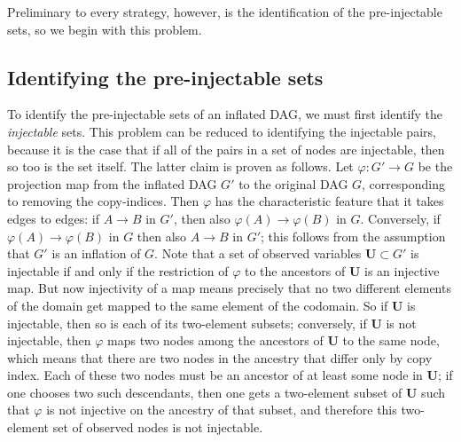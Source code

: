 Preliminary to every strategy, however, is the identification of the pre-injectable sets, so we begin with this problem.

\subsection{Identifying the pre-injectable sets}\label{step:findpreinjectable}

To identify the pre-injectable sets of an inflated DAG, we must first identify the \emph{injectable} sets. This problem can be reduced to identifying the injectable pairs, because it is the case that if all of the pairs in a set of nodes are injectable, then so too is the set itself.  The latter claim is proven as follows.   
Let $\varphi : G' \to G$ be the projection map from the inflated DAG $G'$ to
the original DAG $G$, corresponding to removing the copy-indices.  Then $\varphi$ has the characteristic feature that it takes edges to edges: if $A  \to B$ in $G'$, then also $\varphi(A) \to \varphi(B)$ in $G$. Conversely, if
$\varphi(A) \to \varphi(B)$ in $G$ then also $A \to B$ in $G'$; this follows from the
assumption that $G'$ is an inflation of $G$. 
Note that a set of observed variables $\bm{U} \subset G'$ is injectable if and only if the
restriction of $\varphi$ to the ancestors of $\bm{U}$ is an injective map. 
But now injectivity of a map means precisely that no two different
elements of the domain get mapped to the same element of the codomain.
So if $\bm{U}$ is injectable, then so is each of its two-element subsets;
conversely, if $\bm{U}$ is not injectable, then $\varphi$ maps two nodes among the
ancestors of $\bm{U}$ to the same node, which means that there are two nodes in the
ancestry that differ only by copy index. Each of these two nodes must be
an ancestor of at least some node in $\bm{U}$; if one chooses two such
descendants, then one gets a two-element subset of $\bm{U}$ such that $\varphi$ is not
injective on the ancestry of that subset, and therefore this two-element
set of observed nodes is not injectable.
\color{black}


